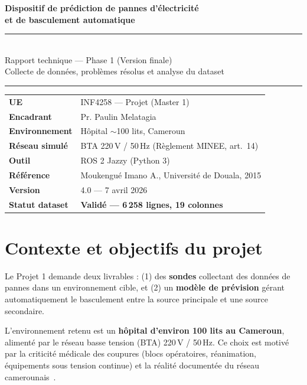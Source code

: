 \documentclass[12pt,a4paper]{article}
\begin{document}
\begin{titlepage}
  \centering
  \vspace*{2cm}
  {\LARGE\bfseries Dispositif de prédiction de pannes d'électricité\\
  et de basculement automatique\\[0.5em]}
  \rule{\linewidth}{0.5pt}\\[0.3em]
  {\large Rapport technique — Phase 1 (Version finale)\\
  Collecte de données, problèmes résolus et analyse du dataset}\\[0.5em]
  \rule{\linewidth}{0.5pt}
  \vspace{1.5cm}

  \begin{tabular}{ll}
    \textbf{UE}              & INF4258 — Projet (Master 1) \\
    \textbf{Encadrant}       & Pr. Paulin Melatagia \\
    \textbf{Environnement}   & Hôpital $\sim$100 lits, Cameroun \\
    \textbf{Réseau simulé}   & BTA 220\,V / 50\,Hz (Règlement MINEE, art.~14) \\
    \textbf{Outil}           & ROS 2 Jazzy (Python 3) \\
    \textbf{Référence}       & Moukengué Imano A., Université de Douala, 2015 \\
    \textbf{Version}         & 4.0 — 7 avril 2026 \\
    \textbf{Statut dataset}  & \textcolor{okgreen}{\textbf{Validé — 6\,258 lignes, 19 colonnes}} \\
  \end{tabular}
  \vfill
\end{titlepage}

\tableofcontents
\newpage

\section{Contexte et objectifs du projet}

Le Projet 1 demande deux livrables : (1) des \textbf{sondes} collectant des données
de pannes dans un environnement cible, et (2) un \textbf{modèle de prévision} gérant
automatiquement le basculement entre la source principale et une source secondaire.

L'environnement retenu est un \textbf{hôpital d'environ 100 lits au Cameroun},
alimenté par le réseau basse tension (BTA) 220\,V / 50\,Hz.  Ce choix est motivé
par la criticité médicale des coupures (blocs opératoires, réanimation, équipements
sous tension continue) et la réalité documentée du réseau camerounais~\cite{moukengue}.
\end{document}
